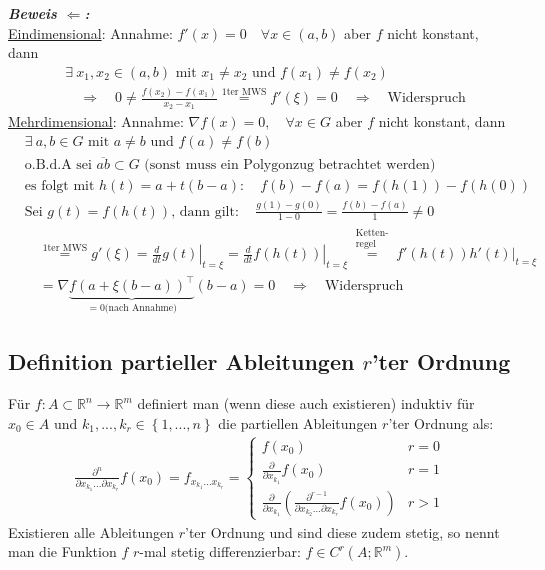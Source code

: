 \documentclass[11pt,a4paper]{book}
\newcommand {\Rn}	{\mathbb{R}^n}
\newcommand {\Rm}	{\mathbb{R}^m}
\newcommand{\1}    	{\mathbbm{1}}
\newcommand{\mitt}	{\textrm{ mit }}
\newcommand{\Beweis}[1][Beweis]
{\begin{mdframed}[backgroundcolor=gray!10,linewidth=0pt]\noindent\textit{\textbf{{#1}:}}~}
\newcommand{\QED}	{\end{mdframed}}
\begin{document}
\Beweis[Beweis \(\Leftarrow\)]\\
\underline{Eindimensional}: Annahme: \(f'(x) = 0 \quad \forall x \in (a,b)\) aber \(f\) nicht konstant, dann
\begin{align*}
	&\exists~ x_1, x_2 \in (a,b) \mitt x_1 \neq x_2 \textrm{ und } f(x_1) \neq f(x_2) \\
	&\quad\Rightarrow\quad
	0 \neq \frac{f(x_2) - f(x_1)}{x_2 - x_1} \stackrel{\textrm{1ter MWS}}{=} f'(\xi) = 0 
	\quad\Rightarrow\quad \textrm{Widerspruch}
\end{align*}
\underline{Mehrdimensional}: Annahme: \(\nabla f(x) = 0, \quad \forall x \in G\) aber \(f\) nicht konstant, dann
\begin{align*}
	&\exists~ a,b \in G \mitt a \neq b \textrm{ und } f(a) \neq f(b) \\
	&\textrm{o.B.d.A sei } \overline{a b} \subset G \textrm{ (sonst muss ein Polygonzug betrachtet werden)} \\
	& \textrm{es folgt mit } h(t) = a + t(b-a) : \quad f(b) - f(a) = f(h(1)) - f(h(0)) \\
	& \textrm{Sei } g(t) = f(h(t)) \textrm{, dann gilt}: \quad \frac{g(1) - g(0)}{1 - 0} = \frac{f(b)-f(a)}{1} \neq 0 \\
	&\quad \stackrel{\textrm{1ter MWS}}{=} g'(\xi) = 
	\left. \frac{d}{dt} g(t) \right\vert_{t=\xi} = 
	\left. \frac{d}{dt} f(h(t)) \right\vert_{t=\xi} \stackrel{\substack{\textrm{Ketten-}\\\textrm{regel}}}{=}
	\left. f'(h(t))h'(t) \right\vert_{t=\xi} \\
	&\quad = \nabla \underbrace{f(a + \xi(b - a))^\top}_{=0 \textrm{(nach Annahme)}} (b-a) = 0 \quad\Rightarrow\quad \textrm{Widerspruch}
\end{align*} 
\QED

\subsection{Definition partieller Ableitungen \(r\)'ter Ordnung}

Für \(f : A \subset \Rn \rightarrow \Rm \) definiert man (wenn diese auch existieren) induktiv für \(x_0 \in A\) und \(k_1, ..., k_r \in \left\{ 1, ..., n \right\} \) die partiellen Ableitungen \(r\)'ter Ordnung als:
\begin{align*}
	\frac{\partial^n}{\partial x_{k_1} \hdots \partial x_{k_r} } f(x_0) = f_{x_{k_1} \hdots x_{k_r}} = 
	\left\{ \begin{array}{ll}
		f(x_0) & r = 0 \\
		\frac{\partial}{\partial x_{k_1}} f(x_0) & r = 1 \\
		\frac{\partial}{\partial x_{k_1}} \left( \frac{\partial^{r-1}}{\partial x_{k_2} \hdots \partial x_{k_r}} f(x_0) \right) & r > 1
	\end{array} \right.
\end{align*}
Existieren alle Ableitungen \(r\)'ter Ordnung und sind diese zudem stetig, so nennt man die Funktion \(f\) \(r\)-mal stetig differenzierbar: \(f \in C^r(A;\Rm)\).
\end{document}
